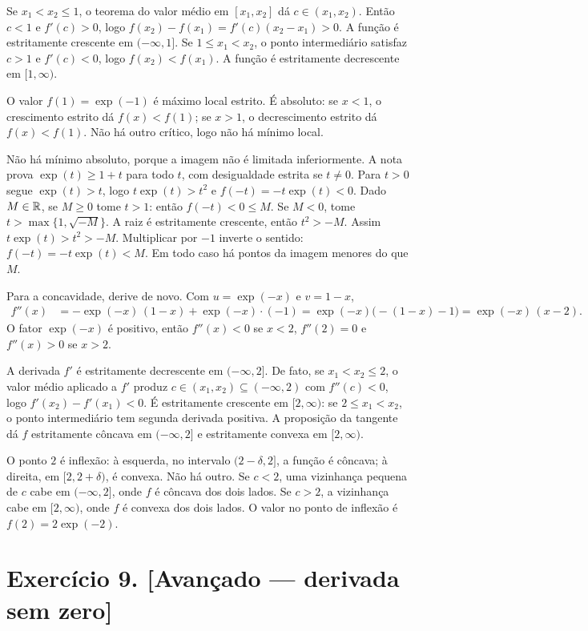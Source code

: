 \documentclass[11pt,a4paper]{article}
\begin{document}
Se $x_1<x_2\le 1$, o teorema do valor médio em $[x_1,x_2]$ dá $c\in(x_1,x_2)$. Então $c<1$ e $f'(c)>0$, logo $f(x_2)-f(x_1)=f'(c)(x_2-x_1)>0$. A função é estritamente crescente em $(-\infty,1]$. Se $1\le x_1<x_2$, o ponto intermediário satisfaz $c>1$ e $f'(c)<0$, logo $f(x_2)<f(x_1)$. A função é estritamente decrescente em $[1,\infty)$.

O valor $f(1)=\exp(-1)$ é máximo local estrito. É absoluto: se $x<1$, o crescimento estrito dá $f(x)<f(1)$; se $x>1$, o decrescimento estrito dá $f(x)<f(1)$. Não há outro crítico, logo não há mínimo local.

Não há mínimo absoluto, porque a imagem não é limitada inferiormente. A nota prova $\exp(t)\ge 1+t$ para todo $t$, com desigualdade estrita se $t\neq 0$. Para $t>0$ segue $\exp(t)>t$, logo $t\exp(t)>t^2$ e $f(-t)=-t\exp(t)<0$. Dado $M\in\mathbb{R}$, se $M\ge 0$ tome $t>1$: então $f(-t)<0\le M$. Se $M<0$, tome $t>\max\{1,\sqrt{-M}\}$. A raiz é estritamente crescente, então $t^2>-M$. Assim $t\exp(t)>t^2>-M$. Multiplicar por $-1$ inverte o sentido: $f(-t)=-t\exp(t)<M$. Em todo caso há pontos da imagem menores do que $M$.

Para a concavidade, derive de novo. Com $u=\exp(-x)$ e $v=1-x$,
\begin{align*}
f''(x)
&=-\exp(-x)\,(1-x)+\exp(-x)\cdot(-1)
=\exp(-x)\bigl(-(1-x)-1\bigr)
=\exp(-x)\,(x-2).
\end{align*}
O fator $\exp(-x)$ é positivo, então $f''(x)<0$ se $x<2$, $f''(2)=0$ e $f''(x)>0$ se $x>2$.

A derivada $f'$ é estritamente decrescente em $(-\infty,2]$. De fato, se $x_1<x_2\le 2$, o valor médio aplicado a $f'$ produz $c\in(x_1,x_2)\subseteq(-\infty,2)$ com $f''(c)<0$, logo $f'(x_2)-f'(x_1)<0$. É estritamente crescente em $[2,\infty)$: se $2\le x_1<x_2$, o ponto intermediário tem segunda derivada positiva. A proposição da tangente dá $f$ estritamente côncava em $(-\infty,2]$ e estritamente convexa em $[2,\infty)$.

O ponto $2$ é inflexão: à esquerda, no intervalo $(2-\delta,2]$, a função é côncava; à direita, em $[2,2+\delta)$, é convexa. Não há outro. Se $c<2$, uma vizinhança pequena de $c$ cabe em $(-\infty,2]$, onde $f$ é côncava dos dois lados. Se $c>2$, a vizinhança cabe em $[2,\infty)$, onde $f$ é convexa dos dois lados. O valor no ponto de inflexão é $f(2)=2\exp(-2)$.

\section*{Exercício 9. [Avançado --- derivada sem zero]}
\end{document}
